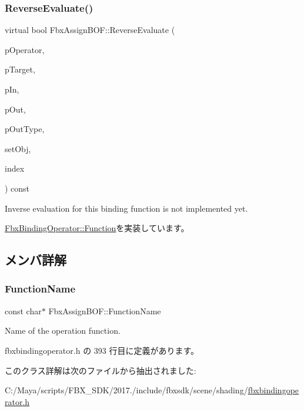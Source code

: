 \subsubsection{\texorpdfstring{Reverse\+Evaluate()}{ReverseEvaluate()}}
{\footnotesize\ttfamily virtual bool Fbx\+Assign\+B\+O\+F\+::\+Reverse\+Evaluate (\begin{DoxyParamCaption}\item[{const \hyperlink{class_fbx_binding_operator}{Fbx\+Binding\+Operator} $\ast$}]{p\+Operator,  }\item[{const \hyperlink{class_fbx_object}{Fbx\+Object} $\ast$}]{p\+Target,  }\item[{const void $\ast$}]{p\+In,  }\item[{void $\ast$$\ast$}]{p\+Out,  }\item[{\hyperlink{fbxpropertytypes_8h_a73913a5ddfb20e57c6f25e9e6784bd92}{E\+Fbx\+Type} $\ast$}]{p\+Out\+Type,  }\item[{bool}]{set\+Obj,  }\item[{int}]{index }\end{DoxyParamCaption}) const\hspace{0.3cm}{\ttfamily [virtual]}}



Inverse evaluation for this binding function is not implemented yet. 



\hyperlink{class_fbx_binding_operator_1_1_function_a9bbeec993a6e453a6569e7f40a85fd52}{Fbx\+Binding\+Operator\+::\+Function}を実装しています。



\subsection{メンバ詳解}
\mbox{\label{class_fbx_assign_b_o_f_a65ac910c4b20983717f7556ae8ee7a27}} 
\subsubsection{\texorpdfstring{Function\+Name}{FunctionName}}
{\footnotesize\ttfamily const char$\ast$ Fbx\+Assign\+B\+O\+F\+::\+Function\+Name\hspace{0.3cm}{\ttfamily [static]}}



Name of the operation function. 



 fbxbindingoperator.\+h の 393 行目に定義があります。



このクラス詳解は次のファイルから抽出されました\+:\begin{DoxyCompactItemize}
\item 
C\+:/\+Maya/scripts/\+F\+B\+X\+\_\+\+S\+D\+K/2017./include/fbxsdk/scene/shading/\hyperlink{fbxbindingoperator_8h}{fbxbindingoperator.\+h}\end{DoxyCompactItemize}
